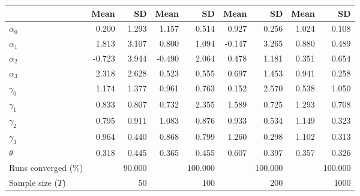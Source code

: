 
\begin{tabular}[t]{lrrrrrrrr}
\toprule
  & Mean & SD & Mean  & SD  & Mean   & SD   & Mean    & SD   \\
\midrule
$\alpha_{0}$ & 0.200 & 1.293 & 1.157 & 0.514 & 0.927 & 0.256 & 1.024 & 0.108\\
$\alpha_{1}$ & 1.813 & 3.107 & 0.800 & 1.094 & -0.147 & 3.265 & 0.880 & 0.489\\
$\alpha_{2}$ & -0.723 & 3.944 & -0.490 & 2.064 & 0.478 & 1.181 & 0.351 & 0.654\\
$\alpha_{3}$ & 2.318 & 2.628 & 0.523 & 0.555 & 0.697 & 1.453 & 0.941 & 0.258\\
$\gamma_{0}$ & 1.174 & 1.377 & 0.961 & 0.763 & 0.152 & 2.570 & 0.538 & 1.050\\
$\gamma_{1}$ & 0.833 & 0.807 & 0.732 & 2.355 & 1.589 & 0.725 & 1.293 & 0.708\\
$\gamma_{2}$ & 0.795 & 0.911 & 1.083 & 0.876 & 0.933 & 0.534 & 1.149 & 0.323\\
$\gamma_{3}$ & 0.964 & 0.440 & 0.868 & 0.799 & 1.260 & 0.298 & 1.102 & 0.313\\
$\theta$ & 0.318 & 0.445 & 0.365 & 0.455 & 0.607 & 0.397 & 0.357 & 0.326\\
Runs converged (\%) &  & 90.000 &  & 100.000 &  & 100.000 &  & 100.000\\
Sample size ($T$) &  & 50 &  & 100 &  & 200 &  & 1000\\
\bottomrule
\end{tabular}

